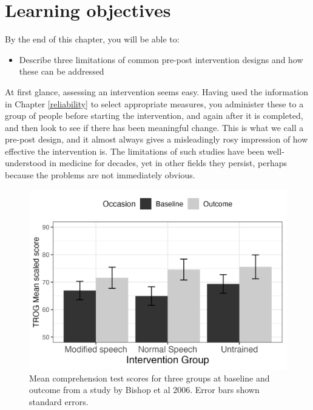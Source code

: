 \documentclass{krantz}
\providecommand{\tightlist}{%
\setlength{\itemsep}{0pt}\setlength{\parskip}{0pt}}
\begin{document}
\hypertarget{learning-objectives-4}{%
\section{Learning objectives}\label{learning-objectives-4}}

By the end of this chapter, you will be able to:

\begin{itemize}
\tightlist
\item
  Describe three limitations of common pre-post intervention designs and how these can be addressed
\end{itemize}

At first glance, assessing an intervention seems easy. Having used the information in Chapter \ref{reliability} to select appropriate measures, you administer these to a group of people before starting the intervention, and again after it is completed, and then look to see if there has been meaningful change. This is what we call a pre-post design, and it almost always gives a misleadingly rosy impression of how effective the intervention is. The limitations of such studies have been well-understood in medicine for decades, yet in other fields they persist, perhaps because the problems are not immediately obvious.

\begin{figure}
\includegraphics[width=0.8\linewidth]{images_bw/trogchangefig} \caption{Mean comprehension test scores for three groups at baseline and outcome from a study by Bishop et al 2006. Error bars shown standard errors.}\label{fig:trogfig}
\end{figure}
\end{document}
